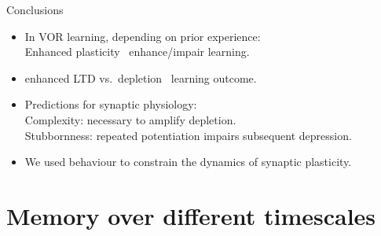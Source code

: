 \documentclass[final]{beamer}%
\begin{document}

\begin{frame}{Conclusions}
%
 \begin{itemize}
   \item %
   In VOR learning, depending on prior experience: \\
   \alert{Enhanced plasticity \lto\ enhance/impair} learning.


   \vp\item \alert{enhanced LTD} vs.\ \alert{depletion} \lto\ learning outcome.



   \vp\item Predictions for synaptic physiology:\\
   \alert{Complexity:} necessary to amplify depletion.\\
   \alert{Stubbornness:} repeated potentiation impairs subsequent depression.

   \vp\item  We used behaviour to constrain the dynamics of synaptic plasticity.
\end{itemize}
%
\end{frame}



\section{Memory over different timescales}
\end{document}

